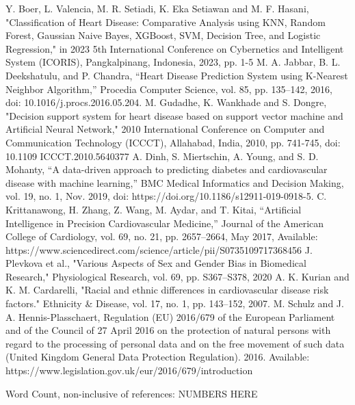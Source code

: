 \documentclass[conference]{IEEEtran}
\begin{document}
\begin{thebibliography}{00}
Y. Boer, L. Valencia, M. R. Setiadi, K. Eka Setiawan and M. F. Hasani, "Classification of Heart Disease: Comparative Analysis using KNN, Random Forest, Gaussian Naive Bayes, XGBoost, SVM, Decision Tree, and Logistic Regression," in 2023 5th International Conference on Cybernetics and Intelligent System (ICORIS), Pangkalpinang, Indonesia, 2023, pp. 1-5
 M. A. Jabbar, B. L. Deekshatulu, and P. Chandra, “Heart Disease Prediction System using K-Nearest Neighbor Algorithm,” Procedia Computer Science, vol. 85, pp. 135–142, 2016, doi: 10.1016/j.procs.2016.05.204.
 M. Gudadhe, K. Wankhade and S. Dongre, "Decision support system for heart disease based on support vector machine and Artificial Neural Network," 2010 International Conference on Computer and Communication Technology (ICCCT), Allahabad, India, 2010, pp. 741-745, doi: 10.1109 ICCCT.2010.5640377
 A. Dinh, S. Miertschin, A. Young, and S. D. Mohanty, “A data-driven approach to predicting diabetes and cardiovascular disease with machine learning,” BMC Medical Informatics and Decision Making, vol. 19, no. 1, Nov. 2019, doi: https://doi.org/10.1186/s12911-019-0918-5.
 C. Krittanawong, H. Zhang, Z. Wang, M. Aydar, and T. Kitai, “Artificial Intelligence in Precision Cardiovascular Medicine,” Journal of the American College of Cardiology, vol. 69, no. 21, pp. 2657–2664, May 2017, Available: https://www.sciencedirect.com/science/article/pii/S0735109717368456
 J. Plevkova et al., "Various Aspects of Sex and Gender Bias in Biomedical Research," Physiological Research, vol. 69, pp. S367–S378, 2020
 A. K. Kurian and K. M. Cardarelli, "Racial and ethnic differences in cardiovascular disease risk factors." Ethnicity \& Disease, vol. 17, no. 1, pp. 143–152, 2007.
 M. Schulz and J. A. Hennis-Plasschaert, Regulation (EU) 2016/679 of the European Parliament and of the Council of 27 April 2016 on the protection of natural persons with regard to the processing of personal data and on the free movement of such data (United Kingdom General Data Protection Regulation). 2016. Available: https://www.legislation.gov.uk/eur/2016/679/introduction
\end{thebibliography}


\vspace{12pt}
\color{red}
Word Count, non-inclusive of references: NUMBERS HERE
\end{document}
